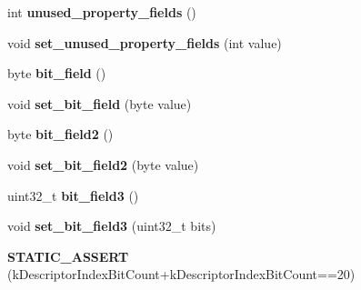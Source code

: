\begin{DoxyCompactItemize}
\item 
\hypertarget{classv8_1_1internal_1_1_map_a0e6d268158bcc1213693c1153259d526}{}int {\bfseries unused\+\_\+property\+\_\+fields} ()\label{classv8_1_1internal_1_1_map_a0e6d268158bcc1213693c1153259d526}

\item 
\hypertarget{classv8_1_1internal_1_1_map_a34d915512b56b8e2436b3521fbd1c087}{}void {\bfseries set\+\_\+unused\+\_\+property\+\_\+fields} (int value)\label{classv8_1_1internal_1_1_map_a34d915512b56b8e2436b3521fbd1c087}

\item 
\hypertarget{classv8_1_1internal_1_1_map_a36056edaa3555fb4ed4ec3fc35406212}{}byte {\bfseries bit\+\_\+field} ()\label{classv8_1_1internal_1_1_map_a36056edaa3555fb4ed4ec3fc35406212}

\item 
\hypertarget{classv8_1_1internal_1_1_map_a358b7f2538e07086e392fc86bc1fb35d}{}void {\bfseries set\+\_\+bit\+\_\+field} (byte value)\label{classv8_1_1internal_1_1_map_a358b7f2538e07086e392fc86bc1fb35d}

\item 
\hypertarget{classv8_1_1internal_1_1_map_ac5a6f2a8b80471e50d966da675061cdf}{}byte {\bfseries bit\+\_\+field2} ()\label{classv8_1_1internal_1_1_map_ac5a6f2a8b80471e50d966da675061cdf}

\item 
\hypertarget{classv8_1_1internal_1_1_map_ab95b78f0a4924c32aeb284f102242f43}{}void {\bfseries set\+\_\+bit\+\_\+field2} (byte value)\label{classv8_1_1internal_1_1_map_ab95b78f0a4924c32aeb284f102242f43}

\item 
\hypertarget{classv8_1_1internal_1_1_map_a040960a58a38acc5373f67b2fab8cb97}{}uint32\+\_\+t {\bfseries bit\+\_\+field3} ()\label{classv8_1_1internal_1_1_map_a040960a58a38acc5373f67b2fab8cb97}

\item 
\hypertarget{classv8_1_1internal_1_1_map_a28beaae008820bce825849a558dcf781}{}void {\bfseries set\+\_\+bit\+\_\+field3} (uint32\+\_\+t bits)\label{classv8_1_1internal_1_1_map_a28beaae008820bce825849a558dcf781}

\item 
\hypertarget{classv8_1_1internal_1_1_map_a3400fbf7d3172229a68958d8f24e4746}{}{\bfseries S\+T\+A\+T\+I\+C\+\_\+\+A\+S\+S\+E\+R\+T} (k\+Descriptor\+Index\+Bit\+Count+k\+Descriptor\+Index\+Bit\+Count==20)\label{classv8_1_1internal_1_1_map_a3400fbf7d3172229a68958d8f24e4746}


\end{DoxyCompactItemize}
